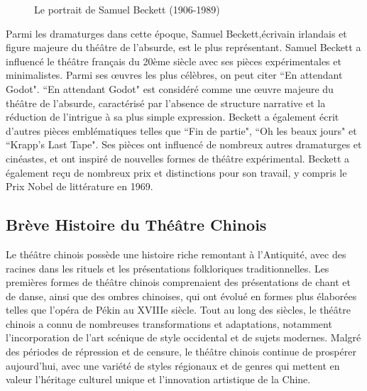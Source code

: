 \documentclass[UTF8,a4paper,12pt]{ctexart}
\numberwithin{equation}{section}
\newcommand{\mycite}[1]{\cite{#1}}
\begin{document}
\begin{figure}[H] 
\caption{Le portrait de Samuel Beckett (1906-1989)}
\end{figure}
Parmi les dramaturges dans cette époque, Samuel Beckett,écrivain irlandais et figure majeure du théâtre de l'absurde, est le plus représentant. Samuel Beckett a influencé le théâtre français du 20ème siècle avec ses pièces expérimentales et minimalistes. Parmi ses œuvres les plus célèbres, on peut citer ``En attendant Godot"\mycite{beckett2006attendant}. ``En attendant Godot" est considéré comme une œuvre majeure du théâtre de l'absurde, caractérisé par l'absence de structure narrative et la réduction de l'intrigue à sa plus simple expression\mycite{harvey1960art}. Beckett a également écrit d'autres pièces emblématiques telles que ``Fin de partie", ``Oh les beaux jours" et ``Krapp's Last Tape". Ses pièces ont influencé de nombreux autres dramaturges et cinéastes, et ont inspiré de nouvelles formes de théâtre expérimental\mycite{bair1990samuel}. Beckett a également reçu de nombreux prix et distinctions pour son travail, y compris le Prix Nobel de littérature en 1969. 

\subsection{Brève Histoire du Théâtre Chinois}
Le théâtre chinois possède une histoire riche remontant à l'Antiquité, avec des racines dans les rituels et les présentations folkloriques traditionnelles. Les premières formes de théâtre chinois comprenaient des présentations de chant et de danse, ainsi que des ombres chinoises, qui ont évolué en formes plus élaborées telles que l'opéra de Pékin au XVIIIe siècle. Tout au long des siècles, le théâtre chinois a connu de nombreuses transformations et adaptations, notamment l'incorporation de l'art scénique de style occidental et de sujets modernes. Malgré des périodes de répression et de censure, le théâtre chinois continue de prospérer aujourd'hui, avec une variété de styles régionaux et de genres qui mettent en valeur l'héritage culturel unique et l'innovation artistique de la Chine.
\end{document}
